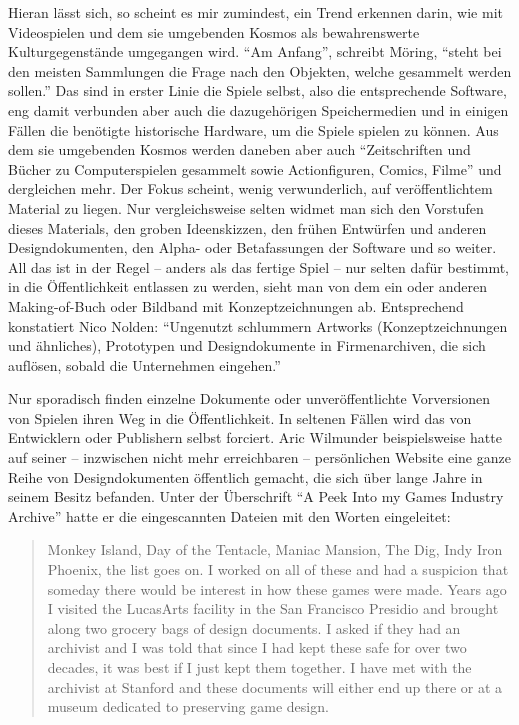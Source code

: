 \documentclass[a5paper,pagesize]{scrbook}
\begin{document}
Hieran lässt sich, so scheint es mir zumindest, ein Trend erkennen darin, wie mit Videospielen und dem sie umgebenden Kosmos als bewahrenswerte Kulturgegenstände umgegangen wird.
\enquote{Am Anfang}, schreibt Möring, \enquote{steht bei den meisten Sammlungen die Frage nach den Objekten, welche gesammelt werden sollen.}\autocite[S.~121]{moering_kulturarchive_2020}
Das sind in erster Linie die Spiele selbst, also die entsprechende Software, eng damit verbunden aber auch die dazugehörigen Speichermedien und in einigen Fällen die benötigte historische Hardware, um die Spiele spielen zu können.
Aus dem sie umgebenden Kosmos werden daneben aber auch \enquote{Zeitschriften und Bücher zu Computerspielen gesammelt sowie Actionfiguren, Comics, Filme}\autocite[S.~121]{moering_kulturarchive_2020} und dergleichen mehr.
Der Fokus scheint, wenig verwunderlich, auf veröffentlichtem Material zu liegen.
Nur vergleichsweise selten widmet man sich den Vorstufen dieses Materials, den groben Ideenskizzen, den frühen Entwürfen und anderen Designdokumenten, den Alpha- oder Betafassungen der Software und so weiter.
All das ist in der Regel -- anders als das fertige Spiel -- nur selten dafür bestimmt, in die Öffentlichkeit entlassen zu werden, sieht man von dem ein oder anderen Making-of-Buch oder Bildband mit Konzeptzeichnungen ab.
Entsprechend konstatiert Nico Nolden:
\enquote{Ungenutzt schlummern Artworks (Konzeptzeichnungen
und ähnliches), Prototypen und Designdokumente in Firmenarchiven, die sich auf‌lösen, sobald die Unternehmen eingehen.}

Nur sporadisch finden einzelne Dokumente oder unveröffentlichte Vorversionen von Spielen ihren Weg in die Öffentlichkeit.
In seltenen Fällen wird das von Entwicklern oder Publishern selbst forciert.
Aric Wilmunder beispielsweise hatte auf seiner -- inzwischen nicht mehr erreichbaren -- persönlichen Website eine ganze Reihe von Designdokumenten öffentlich gemacht, die sich über lange Jahre in seinem Besitz befanden.
Unter der Überschrift \enquote{A Peek Into my Games Industry Archive} hatte er die eingescannten Dateien mit den Worten eingeleitet:

\begin{quote}
Monkey Island, Day of the Tentacle, Maniac Mansion, The Dig, Indy Iron Phoenix, the list goes on.
I worked on all of these and had a suspicion that someday there would be interest in how these games were made.
Years ago I visited the LucasArts facility in the San Francisco Presidio and brought along two grocery bags of design documents.
I asked if they had an archivist and I was told that since I had kept these safe for over two decades, it was best if I just kept them together.
I have met with the archivist at Stanford and these documents will either end up there or at a museum dedicated to preserving game design.\autocite{wilmunder_peek}
\end{quote}
\end{document}
